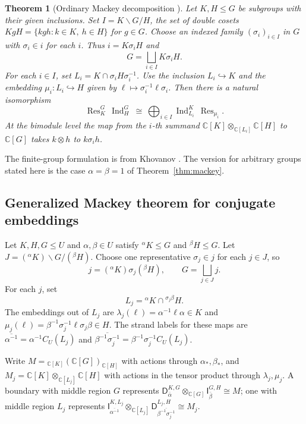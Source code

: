 \documentclass[11pt,a4paper]{article}
\numberwithin{equation}{section}
\newtheorem{theorem}{Theorem}[section]
\theoremstyle{definition}
\newcommand{\C}{\mathbb C}
\newcommand{\Ind}{\operatorname{Ind}}
\newcommand{\Res}{\operatorname{Res}}
\newcommand{\cg}[2]{{}^{#1}\!#2}
\newcommand{\I}{\mathsf I}
\newcommand{\D}{\mathsf D}
\begin{document}
\begin{theorem}[Ordinary Mackey decomposition \cite{mackey}]\label{thm:ordinary-mackey}
Let \(K,H\le G\) be subgroups with their given inclusions. Set
\(I=K\backslash G/H\), the set of double cosets
\(KgH=\{kgh:k\in K,\ h\in H\}\) for \(g\in G\).
Choose an indexed family \((\sigma_i)_{i\in I}\) in \(G\) with
\(\sigma_i\in i\) for each \(i\). Thus \(i=K\sigma_i H\) and
\[
 G=\bigsqcup_{i\in I}K\sigma_i H .
\]
For each \(i\in I\), set \(L_i=K\cap\sigma_i H\sigma_i^{-1}\).
Use the inclusion \(L_i\hookrightarrow K\) and the embedding
\(\mu_i:L_i\hookrightarrow H\) given by \(\ell\mapsto\sigma_i^{-1}\ell\sigma_i\).
Then there is a natural isomorphism
\[
 \Res_K^G\,\Ind_H^G
    \ \cong\ \bigoplus_{i\in I}\Ind_{L_i}^K\,\Res_{\mu_i}.
\]
At the bimodule level the map from the \(i\)-th summand
\(\C[K]\otimes_{\C[L_i]}\C[H]\) to \(\C[G]\) takes
\(k\otimes h\) to \(k\sigma_i h\).
\end{theorem}

The finite-group formulation is from Khovanov
\cite[Eq.~(29) and Prop.~6]{khovanov}. The version for arbitrary groups
stated here is the case \(\alpha=\beta=1\) of Theorem~\ref{thm:mackey}.

\subsection{Generalized Mackey theorem for conjugate embeddings}
\label{sec:generalized}

Let \(K,H,G\le U\) and \(\alpha,\beta\in U\) satisfy
\(\cg{\alpha}{K}\le G\) and \(\cg{\beta}{H}\le G\).
Let \(J=(\cg{\alpha}{K})\backslash G/(\cg{\beta}{H})\). Choose one
representative \(\sigma_j\in j\) for each \(j\in J\), so
\begin{equation}\label{eq:conj-cosets}
 j=(\cg{\alpha}{K})\sigma_j(\cg{\beta}{H}),
 \qquad G=\bigsqcup_{j\in J}j.
\end{equation}
For each \(j\), set
\begin{equation}\label{eq:alt-L}
 L_j=\cg{\alpha}{K}\cap\cg{\sigma_j\beta}{H} .
\end{equation}
The embeddings out of \(L_j\) are
\(\lambda_j(\ell)=\alpha^{-1}\ell\alpha\in K\) and
\(\mu_j(\ell)=\beta^{-1}\sigma_j^{-1}\ell\sigma_j\beta\in H\).
The strand labels for these maps are
\(\overline{\alpha^{-1}}=\alpha^{-1}C_U(L_j)\) and
\(\overline{\beta^{-1}\sigma_j^{-1}}=\beta^{-1}\sigma_j^{-1}C_U(L_j)\).

Write \(M={}_{\C[K]}(\C[G])_{\C[H]}\) with actions through \(\alpha_*,\beta_*\),
and \(M_j=\C[K]\otimes_{\C[L_j]}\C[H]\) with actions in the tensor product
through \(\lambda_j,\mu_j\). A boundary with middle region \(G\)
represents \(\D_{\bar\alpha}^{K,G}\otimes_{\C[G]}\I_{\bar\beta}^{G,H}\cong M\);
one with middle region \(L_j\) represents
\(\I_{\overline{\alpha^{-1}}}^{K,L_j}\otimes_{\C[L_j]}
 \D_{\overline{\beta^{-1}\sigma_j^{-1}}}^{L_j,H}\cong M_j\).
\end{document}
